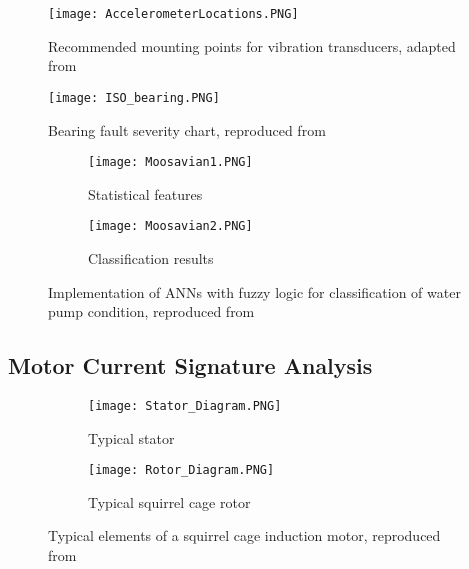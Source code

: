 \begin{figure}
    \centering
    \texttt{[image: AccelerometerLocations.PNG]}
    \caption{Recommended mounting points for vibration transducers, adapted from \cite{ISO10816-7}}
    \label{fig:Accelerometer_Locations}
\end{figure}

\begin{figure}
    \centering
    \texttt{[image: ISO\_bearing.PNG]}
    \caption{Bearing fault severity chart, reproduced from \cite{ISO13373-3}}
    \label{fig:ISO_bearing}
\end{figure}

\begin{figure}
  \centering
  \begin{subfigure}[b]{0.49\textwidth}
    \texttt{[image: Moosavian1.PNG]}
    \caption{Statistical features}
  \end{subfigure}
  \begin{subfigure}[b]{0.49\textwidth}
    \texttt{[image: Moosavian2.PNG]}
    \caption{Classification results}
  \end{subfigure}
  \caption{Implementation of ANNs with fuzzy logic for classification of water pump condition, reproduced from \cite{VIB_moosavian}}
  \label{fig:Moosavian_Figures}
\end{figure}


\subsection{Motor Current Signature Analysis}\label{sec:CM_MCSA}

\begin{figure}
  \centering
  \begin{subfigure}[b]{0.45\textwidth}
    \texttt{[image: Stator\_Diagram.PNG]}
    \caption{Typical stator}
  \end{subfigure}
  \begin{subfigure}[t]{0.54\textwidth}
    \texttt{[image: Rotor\_Diagram.PNG]}
    \caption{Typical squirrel cage rotor}
  \end{subfigure}
  \caption{Typical elements of a squirrel cage induction motor, reproduced from \cite{Squirrel_Cage_Tutorial}}
  \label{fig:Squirrel_Cage_Diagram}
\end{figure}

